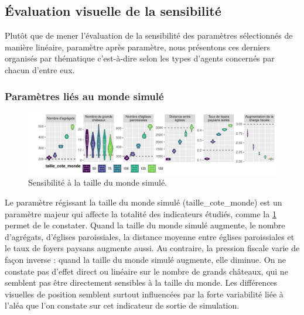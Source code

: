 \subsection{Évaluation visuelle de la sensibilité}


Plutôt que de mener l'évaluation de la sensibilité des paramètres sélectionnés de manière linéaire, paramètre après paramètre, nous présentons ces derniers organisés par thématique c'est-à-dire selon les types d'agents concernés par chacun d'entre eux.

\subsubsection{Paramètres liés au monde simulé}

\begin{figure}[H]
	\centering
	\includegraphics[width=\linewidth]{img/sensib/sensibilite_taille_cote_monde.pdf}
	\caption{Sensibilité à la taille du monde simulé.}
	\label{fig:sensib-monde}
\end{figure}


Le paramètre régissant la taille du monde simulé (\textsf{taille\_cote\_monde}) est un paramètre majeur qui affecte la totalité des indicateurs étudiés, comme la  \cref{fig:sensib-monde} permet de le constater.
Quand la taille du monde simulé augmente, le nombre d'agrégats, d'églises paroissiales, la distance moyenne entre églises paroissiales et le taux de foyers paysans augmente aussi.
Au contraire, la pression fiscale varie de façon inverse : quand la taille du monde simulé augmente, elle diminue.
On ne constate pas d'effet direct ou linéaire sur le nombre de grands châteaux, qui ne semblent pas être directement sensibles à la taille du monde.
Les différences visuelles de position semblent surtout influencées par la forte variabilité liée à l'aléa que l'on constate sur cet indicateur de sortie de simulation.

